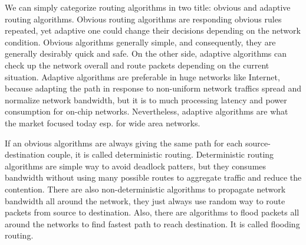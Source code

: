        We can simply categorize routing algorithms in two title: obvious and adaptive routing algorithms. Obvious routing algorithms are responding obvious rules repeated, yet adaptive one could change their decisions depending on the network condition. Obvious algorithms generally simple, and consequently, they are generally desirably quick and safe. On the other side, adaptive algorithms can check up the network overall and route packets depending on the current situation. Adaptive algorithms are preferable in huge networks like Internet\cite{0122007514}, because adapting the path in response to non-uniform network traffics spread and normalize network bandwidth, but it is to much processing latency and power consumption for on-chip networks. Nevertheless, adaptive algorithms are what the market focused today esp. for wide area networks.

        If an obvious algorithms are always giving the same path for each source-destination couple, it is called deterministic routing. Deterministic routing algorithms are simple way to avoid deadlock patters, but they consumes bandwidth without using many possible routes to aggregate traffic and reduce the contention. There are also non-deterministic algorithms to propagate network bandwidth all around the network, they just always use random way to route packets from source to destination. Also, there are algorithms to flood packets all around the networks to find fastest path to reach destination. It is called flooding routing.
